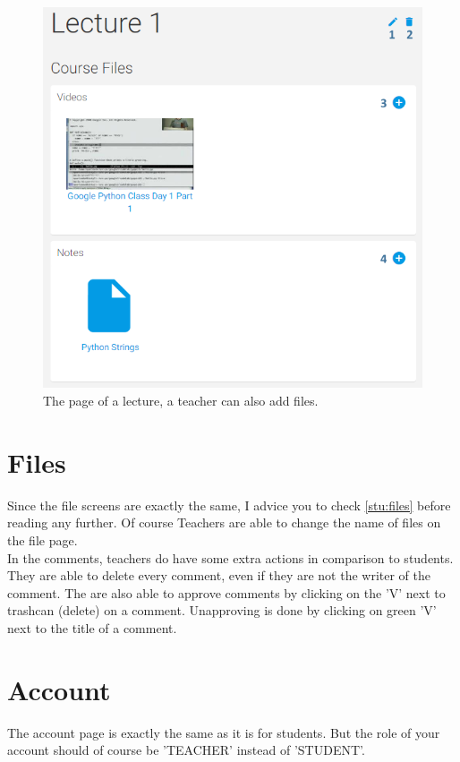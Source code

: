 \documentclass[a4paper,11pt]{report}
\begin{document}
\begin{figure}[H]
\centering
\includegraphics[scale=0.55]{imgs/tea_lecture.png}
\caption{The page of a lecture, a teacher can also add files.}
\label{fig:tea_lecture}
\end{figure}

\section{Files}
Since the file screens are exactly the same, I advice you to check \ref{stu:files} before reading any further. Of course Teachers are able to change the name of files on the file page.\\

In the comments, teachers do have some extra actions in comparison to students. They are able to delete every comment, even if they are not the writer of the comment. The are also able to approve comments by clicking on the 'V' next to trashcan (delete) on a comment. Unapproving is done by clicking on green 'V' next to the title of a comment.

\section{Account}
The account page is exactly the same as it is for students. But the role of your account should of course be 'TEACHER' instead of 'STUDENT'.
\end{document}
